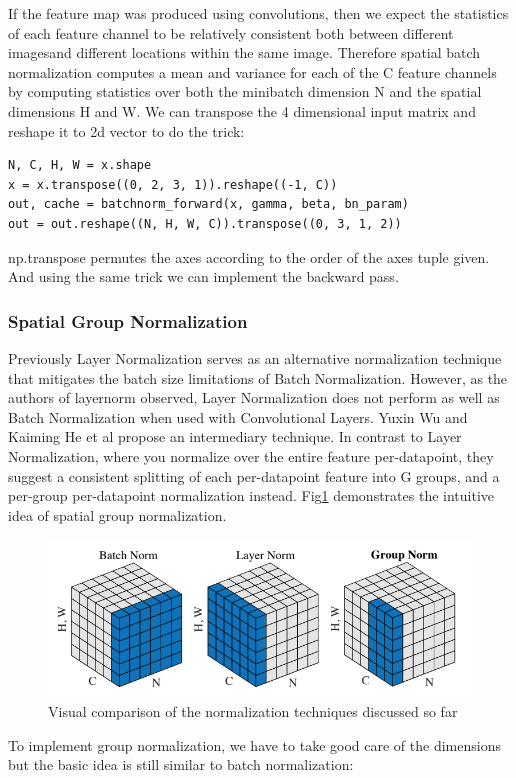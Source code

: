 \documentclass{article} %
\begin{document}
If the feature map was produced using convolutions, then we expect the statistics of each feature channel to be relatively consistent both between different imagesand different locations within the same image. Therefore spatial batch normalization computes a mean and variance for each of the C feature channels by computing statistics over both the minibatch dimension N and the spatial dimensions H and W. We can transpose the 4 dimensional input matrix and reshape it to 2d vector to do the trick:
\begin{lstlisting}
N, C, H, W = x.shape
x = x.transpose((0, 2, 3, 1)).reshape((-1, C))
out, cache = batchnorm_forward(x, gamma, beta, bn_param)
out = out.reshape((N, H, W, C)).transpose((0, 3, 1, 2))
\end{lstlisting}
np.transpose permutes the axes according to the order of the axes tuple given. And using the same trick we can implement the backward pass.

\subsubsection{Spatial Group Normalization}
Previously Layer Normalization serves as an alternative normalization technique that mitigates the batch size limitations of Batch Normalization. However, as the authors of layernorm observed, Layer Normalization does not perform as well as Batch Normalization when used with Convolutional Layers. Yuxin Wu and Kaiming He et al propose an intermediary technique. In contrast to Layer Normalization, where you normalize over the entire feature per-datapoint, they suggest a consistent splitting of each per-datapoint feature into G groups, and a per-group per-datapoint normalization instead. Fig\ref{fig:norm} demonstrates the intuitive idea of spatial group normalization.
\begin{figure}[H]
	\centering
	\includegraphics[width=.7\textwidth]{normalization.png}
	\caption{Visual comparison of the normalization techniques discussed so far}
	\label{fig:norm}
\end{figure}

To implement group normalization, we have to take good care of the dimensions but the basic idea is still similar to batch normalization:
\end{document}
